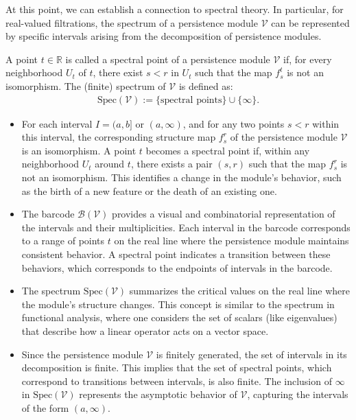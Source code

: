 At this point, we can establish a connection to spectral theory. In particular, for real-valued filtrations, the spectrum of a persistence module $\mathcal{V}$ can be represented by specific intervals arising from the decomposition of persistence modules.

\begin{definition}[Spectrum]
A point $t \in \mathbb{R}$ is called a spectral point of a persistence module $\mathcal{V}$ if, for every neighborhood $U_t$ of $t$, there exist $s < r$ in $U_t$ such that the map $f_{s}^t$ is not an isomorphism. The (finite) spectrum of $\mathcal{V}$ is defined as:
\begin{align}
	\text{Spec}(\mathcal{V}) := \{ \text{spectral points} \} \cup \{\infty\}.
\end{align}
\end{definition}

\newpage
\begin{remark}\noindent
\begin{itemize}
    \item For each interval $I = (a,b]$ or $(a,\infty)$, and for any two points $s < r$ within this interval, the corresponding structure map $f_{s}^r$ of the persistence module $\mathcal{V}$ is an isomorphism. A point $t$ becomes a spectral point if, within any neighborhood $U_t$ around $t$, there exists a pair $(s, r)$ such that the map $f_{s}^r$ is not an isomorphism. This identifies a change in the module's behavior, such as the birth of a new feature or the death of an existing one.
    \item The barcode $\mathcal{B}(\mathcal{V})$ provides a visual and combinatorial representation of the intervals and their multiplicities. Each interval in the barcode corresponds to a range of points $t$ on the real line where the persistence module maintains consistent behavior. A spectral point indicates a transition between these behaviors, which corresponds to the endpoints of intervals in the barcode.
    \item The spectrum $\text{Spec}(\mathcal{V})$ summarizes the critical values on the real line where the module's structure changes. This concept is similar to the spectrum in functional analysis, where one considers the set of scalars (like eigenvalues) that describe how a linear operator acts on a vector space.
    \item Since the persistence module $\mathcal{V}$ is finitely generated, the set of intervals in its decomposition is finite. This implies that the set of spectral points, which correspond to transitions between intervals, is also finite. The inclusion of $\infty$ in $\text{Spec}(\mathcal{V})$ represents the asymptotic behavior of $\mathcal{V}$, capturing the intervals of the form $(a, \infty)$.
\end{itemize}
\end{remark}

